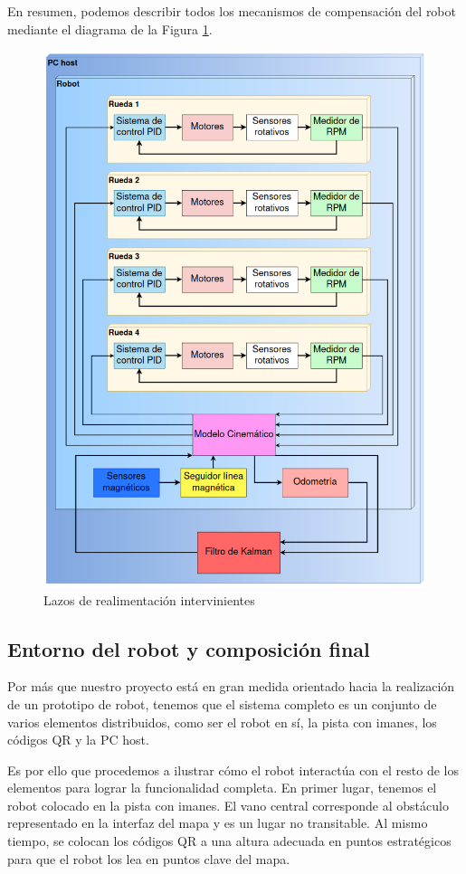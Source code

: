 En resumen, podemos describir todos los mecanismos de compensación del robot mediante el diagrama de la Figura \ref{fig:integsistemalazosrealim}.

\begin{figure}[H]
    \centering
    \includegraphics[width=0.8\linewidth]{images/integ_sistema_diag_compensacion.png}
    \caption{Lazos de realimentación intervinientes}
    \label{fig:integsistemalazosrealim}
\end{figure}


\subsection{Entorno del robot y composición final}

Por más que nuestro proyecto está en gran medida orientado hacia la realización de un prototipo de robot, tenemos que el sistema completo es un conjunto de varios elementos distribuidos, como ser el robot en sí, la pista con imanes, los códigos QR y la PC host.

Es por ello que procedemos a ilustrar cómo el robot interactúa con el resto de los elementos para lograr la funcionalidad completa. En primer lugar, tenemos el robot colocado en la pista con imanes. El vano central corresponde al obstáculo representado en la interfaz del mapa y es un lugar no transitable. Al mismo tiempo, se colocan los códigos QR a una altura adecuada en puntos estratégicos para que el robot los lea en puntos clave del mapa.

